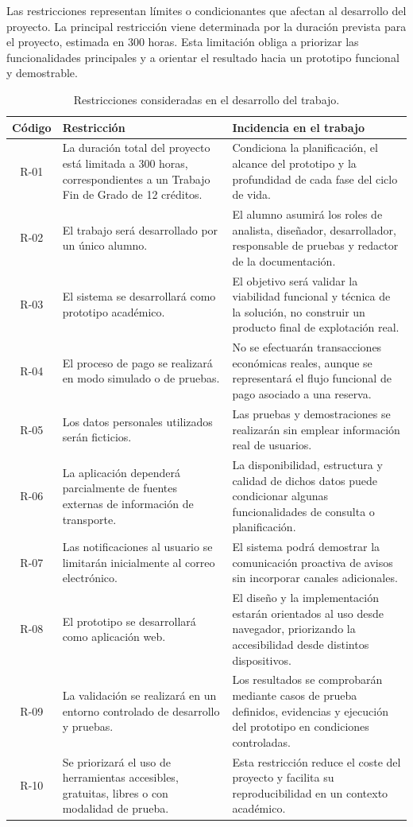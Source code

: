 Las restricciones representan límites o condicionantes que afectan al desarrollo del proyecto. La principal restricción viene determinada por la duración prevista para el proyecto, estimada en 300 horas. Esta limitación obliga a priorizar las funcionalidades principales y a orientar el resultado hacia un prototipo funcional y demostrable.

\begin{table}[h!]
\centering
\small
\begin{tabular}{|c|p{6cm}|p{6cm}|}
\hline
\textbf{Código} & \textbf{Restricción} & \textbf{Incidencia en el trabajo} \\ \hline
R-01 & La duración total del proyecto está limitada a 300 horas, correspondientes a un Trabajo Fin de Grado de 12 créditos. & Condiciona la planificación, el alcance del prototipo y la profundidad de cada fase del ciclo de vida. \\ \hline
R-02 & El trabajo será desarrollado por un único alumno. & El alumno asumirá los roles de analista, diseñador, desarrollador, responsable de pruebas y redactor de la documentación. \\ \hline
R-03 & El sistema se desarrollará como prototipo académico. & El objetivo será validar la viabilidad funcional y técnica de la solución, no construir un producto final de explotación real. \\ \hline
R-04 & El proceso de pago se realizará en modo simulado o de pruebas. & No se efectuarán transacciones económicas reales, aunque se representará el flujo funcional de pago asociado a una reserva. \\ \hline
R-05 & Los datos personales utilizados serán ficticios. & Las pruebas y demostraciones se realizarán sin emplear información real de usuarios. \\ \hline
R-06 & La aplicación dependerá parcialmente de fuentes externas de información de transporte. & La disponibilidad, estructura y calidad de dichos datos puede condicionar algunas funcionalidades de consulta o planificación. \\ \hline
R-07 & Las notificaciones al usuario se limitarán inicialmente al correo electrónico. & El sistema podrá demostrar la comunicación proactiva de avisos sin incorporar canales adicionales. \\ \hline
R-08 & El prototipo se desarrollará como aplicación web. & El diseño y la implementación estarán orientados al uso desde navegador, priorizando la accesibilidad desde distintos dispositivos. \\ \hline
R-09 & La validación se realizará en un entorno controlado de desarrollo y pruebas. & Los resultados se comprobarán mediante casos de prueba definidos, evidencias y ejecución del prototipo en condiciones controladas. \\ \hline
R-10 & Se priorizará el uso de herramientas accesibles, gratuitas, libres o con modalidad de prueba. & Esta restricción reduce el coste del proyecto y facilita su reproducibilidad en un contexto académico. \\ \hline
\end{tabular}
\caption{Restricciones consideradas en el desarrollo del trabajo.}
\label{tab:restricciones}
\end{table}

